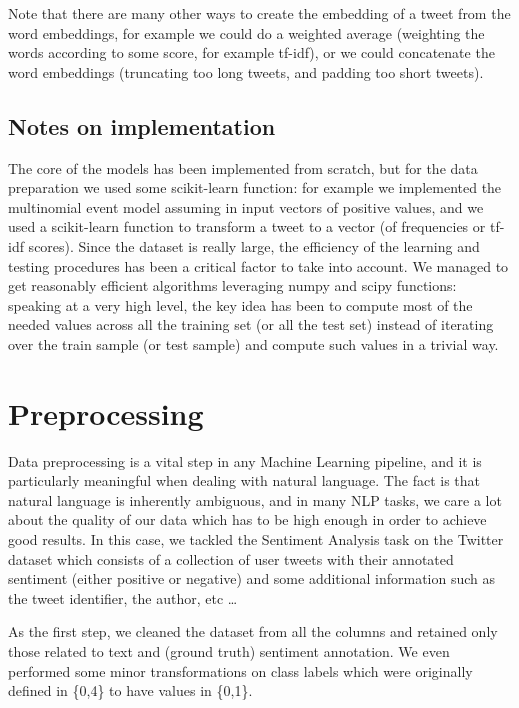 \documentclass{article}
\begin{document}
    Note that there are many other ways to create the embedding of a tweet from the word embeddings, for example we could do a weighted average (weighting the words according to some score, for example tf-idf), or we could concatenate the word embeddings (truncating too long tweets, and padding too short tweets).
    
    \subsection*{Notes on implementation}
    The core of the models has been implemented from scratch, but for the data preparation we used some scikit-learn function: for example we implemented the multinomial event model assuming in input vectors of positive values, and we used a scikit-learn function to transform a tweet to a vector (of frequencies or tf-idf scores). Since the dataset is really large, the efficiency of the learning and testing procedures has been a critical factor to take into account. We managed to get reasonably efficient algorithms leveraging numpy and scipy functions: speaking at a very high level, the key idea has been to compute most of the needed values across all the training set (or all the test set) instead of iterating over the train sample (or test sample) and compute such values in a trivial way.

    \section*{Preprocessing}

    Data preprocessing is a vital step in any Machine Learning pipeline, and it is particularly meaningful when dealing with natural language.
    The fact is that natural language is inherently ambiguous, and in many NLP tasks, we care a lot about the quality of our data which has to be high enough in order to achieve good results.
    In this case, we tackled the Sentiment Analysis task on the Twitter dataset which consists of a collection of user tweets with their annotated sentiment (either positive or negative) and some additional information such as the tweet identifier, the author, etc \dots
    
    As the first step, we cleaned the dataset from all the columns and retained only those related to text and (ground truth) sentiment annotation. We even performed some minor transformations on class labels which were originally defined in \{0,4\} to have values in \{0,1\}.
    
\end{document}
